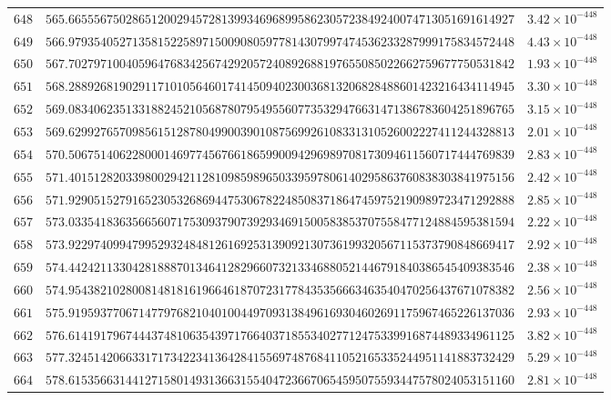 \documentclass[12pt,reqno]{amsart}
\theoremstyle{remark}
\begin{document}
\begin{longtable}{clc}
$648$ & $565.6655567502865120029457281399346968995862305723849240074713051691614927$ & $3.42\times 10^{-448}$ \\
$649$ & $566.9793540527135815225897150090805977814307997474536233287999175834572448$ & $4.43\times 10^{-448}$ \\
$650$ & $567.7027971004059647683425674292057240892688197655085022662759677750531842$ & $1.93\times 10^{-448}$ \\
$651$ & $568.2889268190291171010564601741450940230036813206828488601423216434114945$ & $3.30\times 10^{-448}$ \\
$652$ & $569.0834062351331882452105687807954955607735329476631471386783604251896765$ & $3.15\times 10^{-448}$ \\
$653$ & $569.6299276570985615128780499003901087569926108331310526002227411244328813$ & $2.01\times 10^{-448}$ \\
$654$ & $570.5067514062280001469774567661865990094296989708173094611560717444769839$ & $2.83\times 10^{-448}$ \\
$655$ & $571.4015128203398002942112810985989650339597806140295863760838303841975156$ & $2.42\times 10^{-448}$ \\
$656$ & $571.9290515279165230532686944753067822485083718647459752190989723471292888$ & $2.85\times 10^{-448}$ \\
$657$ & $573.0335418363566560717530937907392934691500583853707558477124884595381594$ & $2.22\times 10^{-448}$ \\
$658$ & $573.9229740994799529324848126169253139092130736199320567115373790848669417$ & $2.92\times 10^{-448}$ \\
$659$ & $574.4424211330428188870134641282966073213346880521446791840386545409383546$ & $2.38\times 10^{-448}$ \\
$660$ & $574.9543821028008148181619664618707231778435356663463540470256437671078382$ & $2.56\times 10^{-448}$ \\
$661$ & $575.9195937706714779768210401004497093138496169304602691175967465226137036$ & $2.93\times 10^{-448}$ \\
$662$ & $576.6141917967444374810635439717664037185534027712475339916874489334961125$ & $3.82\times 10^{-448}$ \\
$663$ & $577.3245142066331717342234136428415569748768411052165335244951141883732429$ & $5.29\times 10^{-448}$ \\
$664$ & $578.6153566314412715801493136631554047236670654595075593447578024053151160$ & $2.81\times 10^{-448}$ \\

\end{longtable}
\end{document}
